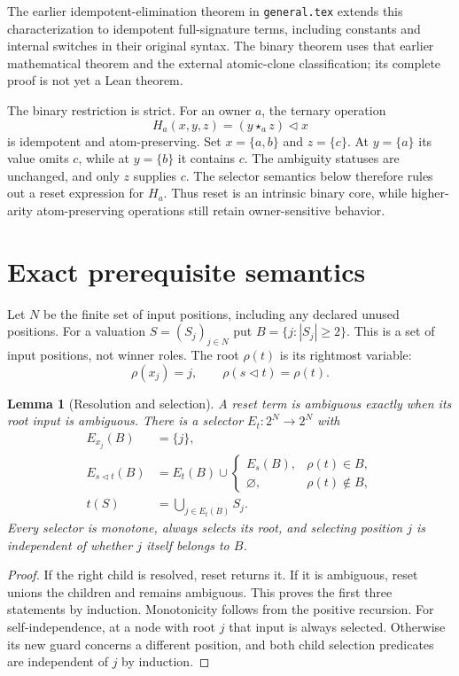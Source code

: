 \documentclass[11pt]{article}
\newtheorem{lemma}[theorem]{Lemma}
\newcommand{\del}{\mathbin{\triangleleft}}
\begin{document}
The earlier idempotent-elimination theorem in \texttt{general.tex}
extends this characterization to idempotent full-signature terms,
including constants and internal switches in their original syntax.
The binary theorem uses that earlier mathematical theorem and the
external atomic-clone classification; its complete proof is not yet a
Lean theorem.

The binary restriction is strict. For an owner $a$, the ternary operation
\[
 H_a(x,y,z)=(y\star_a z)\del x
\]
is idempotent and atom-preserving. Set $x=\{a,b\}$ and $z=\{c\}$.
At $y=\{a\}$ its value omits $c$, while at $y=\{b\}$ it contains $c$.
The ambiguity statuses are unchanged, and only $z$ supplies $c$.
The selector semantics below therefore rules out a reset expression
for $H_a$. Thus reset is an intrinsic binary core, while higher-arity
atom-preserving operations still retain owner-sensitive behavior.

\section{Exact prerequisite semantics}

Let $N$ be the finite set of input positions, including any declared
unused positions. For a valuation $S=(S_j)_{j\in N}$ put
$B=\{j:|S_j|\geq2\}$. This is a set of input positions, not winner roles.
The root $\rho(t)$ is its rightmost variable:
\[
 \rho(x_j)=j,\qquad \rho(s\del t)=\rho(t).
\]

\begin{lemma}[Resolution and selection]\label{lem:selection}
A reset term is ambiguous exactly when its root input is ambiguous.
There is a selector $E_t:2^N\to2^N$ with
\begin{align*}
 E_{x_j}(B)&=\{j\},\\
 E_{s\del t}(B)&=E_t(B)\cup
 \begin{cases}E_s(B),&\rho(t)\in B,\\\varnothing,&\rho(t)\notin B,\end{cases}\\
 t(S)&=\bigcup_{j\in E_t(B)}S_j.
\end{align*}
Every selector is monotone, always selects its root, and selecting
position $j$ is independent of whether $j$ itself belongs to $B$.
\end{lemma}
\begin{proof}
If the right child is resolved, reset returns it. If it is ambiguous,
reset unions the children and remains ambiguous. This proves the first
three statements by induction. Monotonicity follows from the positive
recursion. For self-independence, at a node with root $j$ that input is
always selected. Otherwise its new guard concerns a different position,
and both child selection predicates are independent of $j$ by induction.
\end{proof}
\end{document}
